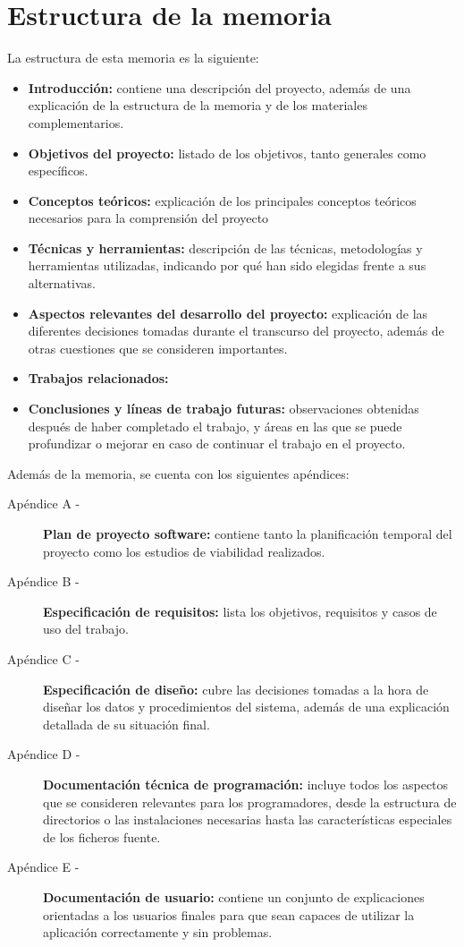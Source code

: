 \section{Estructura de la memoria}
La estructura de esta memoria es la siguiente:
\begin{itemize}
    \item \textbf{Introducción:} contiene una descripción del proyecto, además de una explicación de la estructura de la memoria y de los materiales complementarios.
    \item \textbf{Objetivos del proyecto:} listado de los objetivos, tanto generales como específicos.
    \item \textbf{Conceptos teóricos:} explicación de los principales conceptos teóricos necesarios para la comprensión del proyecto
    \item \textbf{Técnicas y herramientas:} descripción de las técnicas, metodologías y herramientas utilizadas, indicando por qué han sido elegidas frente a sus alternativas.
    \item \textbf{Aspectos relevantes del desarrollo del proyecto:} explicación de las diferentes decisiones tomadas durante el transcurso del proyecto, además de otras cuestiones que se consideren importantes.
    \item \textbf{Trabajos relacionados:} 
    \item \textbf{Conclusiones y líneas de trabajo futuras:} observaciones obtenidas después de haber completado el trabajo, y áreas en las que se puede profundizar o mejorar en caso de continuar el trabajo en el proyecto.
\end{itemize}

Además de la memoria, se cuenta con los siguientes apéndices:
\begin{description}
    \item[Apéndice A -] \textbf{Plan de proyecto software:} contiene tanto la planificación temporal del proyecto como los estudios de viabilidad realizados.
    \item[Apéndice B -] \textbf{Especificación de requisitos:} lista los objetivos, requisitos y casos de uso del trabajo.
    \item[Apéndice C -] \textbf{Especificación de diseño:} cubre las decisiones tomadas a la hora de diseñar los datos y procedimientos del sistema, además de una explicación detallada de su situación final.
    \item[Apéndice D -] \textbf{Documentación técnica de programación:} incluye todos los aspectos que se consideren relevantes para los programadores, desde la estructura de directorios o las instalaciones necesarias hasta las características especiales de los ficheros fuente.
    \item[Apéndice E -] \textbf{Documentación de usuario:} contiene un conjunto de explicaciones orientadas a los usuarios finales para que sean capaces de utilizar la aplicación correctamente y sin problemas.
\end{description}

